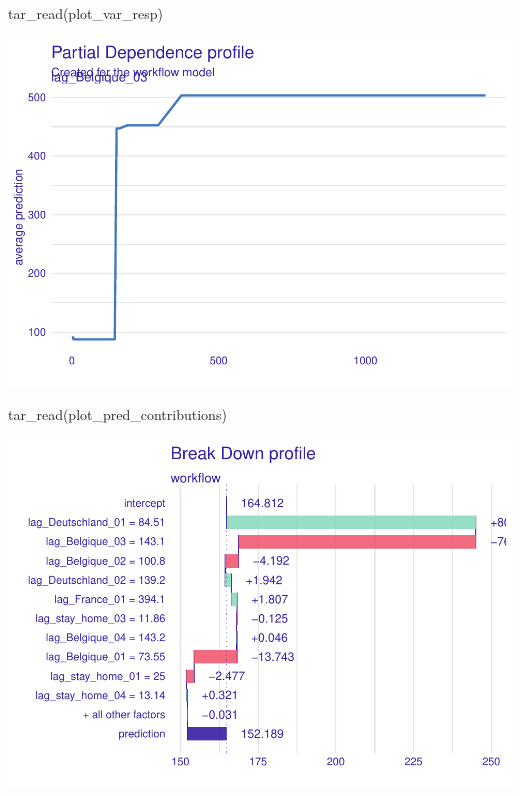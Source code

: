 \documentclass{article}
\newenvironment{Shaded}{\begin{snugshade}}{\end{snugshade}}
\newcommand{\FunctionTok}[1]{\textcolor[rgb]{0.00,0.00,0.00}{#1}}
\newcommand{\NormalTok}[1]{#1}
\begin{document}
\begin{Shaded}
\begin{Highlighting}[]
\FunctionTok{tar\_read}\NormalTok{(plot\_var\_resp)}
\end{Highlighting}
\end{Shaded}

\includegraphics{paper_files/figure-latex/unnamed-chunk-9-1.pdf}

\begin{Shaded}
\begin{Highlighting}[]
\FunctionTok{tar\_read}\NormalTok{(plot\_pred\_contributions)}
\end{Highlighting}
\end{Shaded}

\includegraphics{paper_files/figure-latex/unnamed-chunk-10-1.pdf}
\end{document}
